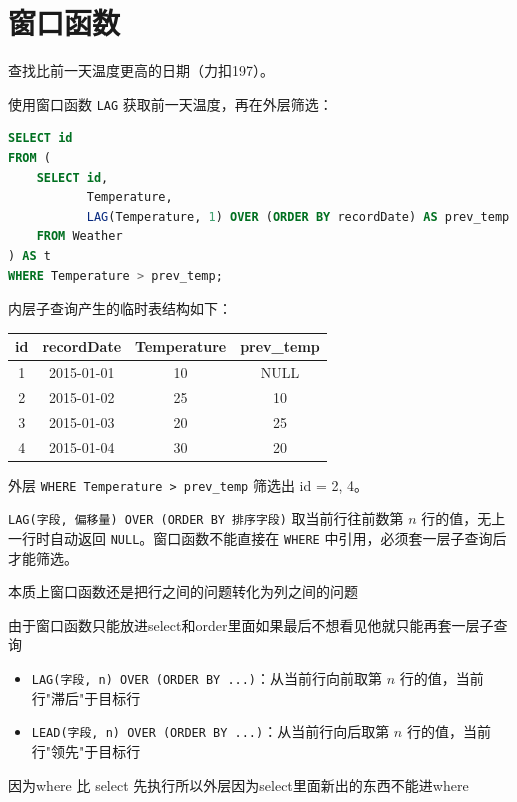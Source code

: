 \section{窗口函数}
\begin{example}
查找比前一天温度更高的日期（力扣197）。

使用窗口函数 \texttt{LAG} 获取前一天温度，再在外层筛选：

\begin{lstlisting}[language=SQL]
SELECT id
FROM (
    SELECT id,
           Temperature,
           LAG(Temperature, 1) OVER (ORDER BY recordDate) AS prev_temp
    FROM Weather
) AS t
WHERE Temperature > prev_temp;
\end{lstlisting}

内层子查询产生的临时表结构如下：

\begin{center}
\begin{tabular}{cccc}
\hline
id & recordDate & Temperature & prev\_temp \\
\hline
1 & 2015-01-01 & 10 & NULL \\
2 & 2015-01-02 & 25 & 10 \\
3 & 2015-01-03 & 20 & 25 \\
4 & 2015-01-04 & 30 & 20 \\
\hline
\end{tabular}
\end{center}

外层 \texttt{WHERE Temperature > prev\_temp} 筛选出 id = 2, 4。
\end{example}

\begin{note}
\texttt{LAG(字段, 偏移量) OVER (ORDER BY 排序字段)} 取当前行往前数第 $n$ 行的值，无上一行时自动返回 \texttt{NULL}。窗口函数不能直接在 \texttt{WHERE} 中引用，必须套一层子查询后才能筛选。
\end{note}
\begin{dxtips}
  本质上窗口函数还是把行之间的问题转化为列之间的问题  
\end{dxtips}
    
\begin{dxtips}
    由于窗口函数只能放进select和order里面如果最后不想看见他就只能再套一层子查询
\end{dxtips}
\begin{itemize}
    \item \texttt{LAG(字段, n) OVER (ORDER BY ...)}：从当前行向前取第 $n$ 行的值，当前行"滞后"于目标行
    \item \texttt{LEAD(字段, n) OVER (ORDER BY ...)}：从当前行向后取第 $n$ 行的值，当前行"领先"于目标行
\end{itemize}
\begin{dxtips}
    因为where 比 select 先执行所以外层因为select里面新出的东西不能进where
\end{dxtips}